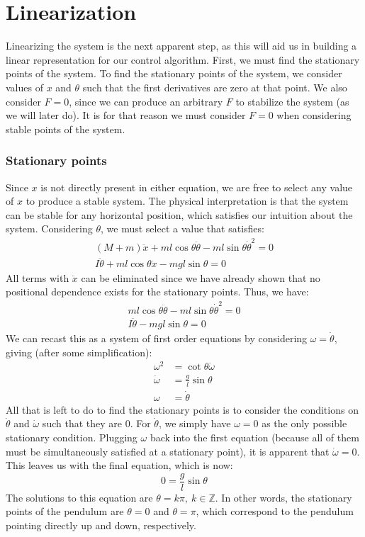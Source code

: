 \section{Linearization}
Linearizing the system is the next apparent step, as this will aid us in building a linear representation for our control algorithm. First, we must find the stationary points of the system. To find the stationary points of the system, we consider values of $x$ and $\theta$ such that the first derivatives are zero at that point. We also consider $F=0$, since we can produce an arbitrary $F$ to stabilize the system (as we will later do). It is for that reason we must consider $F=0$ when considering stable points of the system.

\subsubsection{Stationary points}

Since $x$ is not directly present in either equation, we are free to select any value of $x$ to produce a stable system. The physical interpretation is that the system can be stable for any horizontal position, which satisfies our intuition about the system. Considering $\theta$, we must select a value that satisfies:
$$\begin{array}{c}
     (M+m)\ddot{x}+ml\cos\theta\ddot{\theta}-ml\sin\theta\dot{\theta}^2=0 \\I\ddot{\theta}+ml\cos\theta\ddot{x}-mgl\sin\theta=0
\end{array}$$
All terms with $\ddot{x}$ can be eliminated since we have already shown that no positional dependence exists for the stationary points.  Thus, we have:
$$\begin{array}{c}
    ml\cos\theta\ddot{\theta}-ml\sin\theta\dot{\theta}^2=0 \\I\ddot{\theta}-mgl\sin\theta=0
\end{array}$$
We can recast this as a system of first order equations by considering $\omega=\dot{\theta}$, giving (after some simplification):
\begin{align}
     \omega^2&=\cot\theta\dot{\omega} \\
     \dot{\omega}&=\frac{g}{l}\sin\theta\\
     \omega&=\dot{\theta}
\end{align}
All that is left to do to find the stationary points is to consider the conditions on $\dot{\theta}$ and $\dot{\omega}$ such that they are 0. For $\dot{\theta}$, we simply have $\omega=0$ as the only possible stationary condition. Plugging $\omega$ back into the first equation (because all of them must be simultaneously satisfied at a stationary point), it is apparent that $\dot{\omega}=0$. This leaves us with the final equation, which is now:
$$0=\frac{g}{l}\sin\theta$$
The solutions to this equation are $\theta=k\pi,\ k\in\mathbb{Z}$. In other words, the stationary points of the pendulum are $\theta=0$ and $\theta=\pi$, which correspond to the pendulum pointing directly up and down, respectively.

